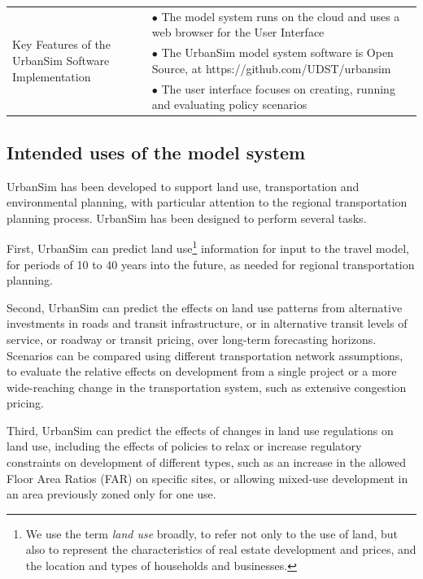 \begin{table}[htbp]
\begin{center}
\begin{tabular}{ p{} p{} }
    \midrule
    
    \multirow[c]{3}{0.25\textwidth}{Key Features of the UrbanSim Software Implementation}
    & $\bullet$ The model system runs on the cloud and uses a web browser for the User Interface\\
    & $\bullet$ The UrbanSim model system software is Open Source, at https://github.com/UDST/urbansim\\
    & $\bullet$ The user interface focuses on creating, running and evaluating policy scenarios\\
    
    \bottomrule
    \end{tabular}
    \end{center}
\end{table}

\subsection{Intended uses of the model system}

UrbanSim has been developed to support land use, transportation and environmental planning, with particular attention to the regional transportation planning process. UrbanSim has been designed to perform several tasks.

First, UrbanSim can predict land use\footnote{We use the term \emph{land use} broadly, to refer not only to the
use of land, but also to represent the characteristics of real estate development and prices, and the location and types of households and businesses.} information for input to the travel model, for periods of 10 to 40 years into the future, as needed for regional transportation planning.

Second, UrbanSim can predict the effects on land use patterns from alternative investments in roads and transit infrastructure, or in alternative transit levels of service, or roadway or transit pricing, over long-term forecasting horizons. Scenarios can be compared using different transportation network assumptions, to evaluate the relative effects on development from a single project or a more wide-reaching change in the transportation system, such as extensive congestion pricing.

Third, UrbanSim can predict the effects of changes in land use regulations on land use, including the effects of policies to relax or increase regulatory constraints on development of different types, such as an increase in the allowed Floor Area Ratios (FAR) on specific sites, or allowing mixed-use development in an area previously zoned only for one use.

